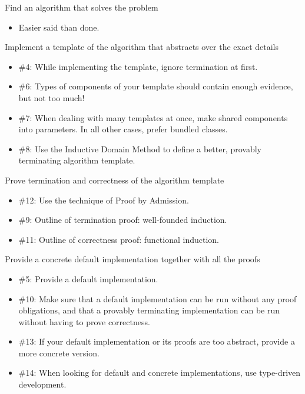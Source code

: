 \documentclass{beamer}
\begin{document}
\begin{frame}{Find an algorithm that solves the problem}
\begin{itemize}
	\item Easier said than done.
\end{itemize}
\end{frame}

\begin{frame}{Implement a template of the algorithm that abstracts over the exact details}
\begin{itemize}
	\item \#4: While implementing the template, ignore termination at first.
	\item \#6: Types of components of your template should contain enough evidence, but not too much!
	\item \#7: When dealing with many templates at once, make shared components into parameters. In all other cases, prefer bundled classes.
	\item \#8: Use the Inductive Domain Method to define a better, provably terminating algorithm template.
\end{itemize}
\end{frame}

\begin{frame}{Prove termination and correctness of the algorithm template}
\begin{itemize}
	\item \#12: Use the technique of Proof by Admission.
	\item \#9: Outline of termination proof: well-founded induction.
	\item \#11: Outline of correctness proof: functional induction.
\end{itemize}
\end{frame}


\begin{frame}{Provide a concrete default implementation together with all the proofs}
\begin{itemize}
	\item \#5: Provide a default implementation.
	\item \#10: Make sure that a default implementation can be run without any proof obligations, and that a provably terminating implementation can be run without having to prove correctness.
	\item \#13: If your default implementation or its proofs are too abstract, provide a more concrete version.
	\item \#14: When looking for default and concrete implementations, use type-driven development.
\end{itemize}
\end{frame}
\end{document}
